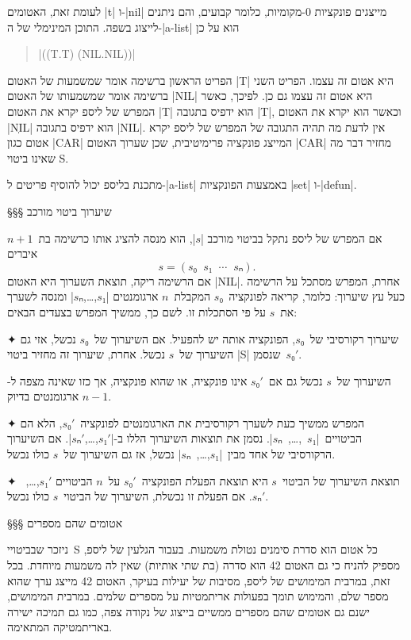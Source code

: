 לעומת זאת, האטומים \E|t| ו-\E|nil| מייצגים פונקציות 0-מקומיות, כלומר קבועים,
והם ניתנים לייצוג בשפה. התוכן המינימלי של ה-\E|a-list| הוא על כן
\begin{english}
  \begin{quote}
    \T|((T.T) (NIL.NIL))|
  \end{quote}
\end{english}
הפריט הראשון ברשימה אומר שמשמעות של האטום \T|T| היא אטום זה עצמו. הפריט השני
ברשימה אומר שמשמעותו של האטום \T|NIL| היא אטום זה עצמו גם כן.
לפיכך, כאשר המפרש של ליספ יקרא את האטום \T|T| הוא ידפיס בתגובה \T|T|, וכאשר הוא
יקרא את האטום \T|NִִִIL| הוא ידפיס בתגובה \T|NIL|.
אין לדעת מה תהיה התגובה של המפרש של ליספ יקרא אטום כגון
\T|CAR| המייצג פונקציה פרימיטיבית, שכן שערוך האטום
\T|CAR| מחזיר דבר מה שאינו ביטוי S.

מתכנת בליספ יכול להוסיף פריטים ל-\E|a-list| באמצעות הפונקציות \E|set|
ו-\E|defun|.

§§§ שיערוך ביטוי מורכב

אם המפרש של ליספ נתקל בביטוי מורכב \E|$s$|, הוא מנסה להציג אותו כרשימה בת~$n+1$
איברים \[
  s=(s₀\;\;s₁\;\;⋯\;\;sₙ).
\] אם הרשימה ריקה, תוצאת השערוך היא האטום \E|NIL|.
אחרת, המפרש מסתכל על הרשימה כעל עץ שיערוך: כלומר, קריאה לפונקציה~$s₀$
המקבלת~$n$ ארגומנטים \E|$s₁$,…,$sₙ$| ומנסה לשערך
את~$s$ על פי הסתכלות זו. לשם כך, ממשיך המפרש בצעדים הבאים:
\begin{enumerate}
  ✦ שיערוך רקורסיבי של~$s₀$, הפונקציה אותה יש להפעיל. אם השיערוך של~$s₀$ נכשל,
  אזי גם השיערוך של~$s$ נכשל. אחרת, שיערוך זה מחזיר ביטוי \E|S| שנסמן~$s₀'$.

  השיערוך של~$s$ נכשל גם אם~$s₀'$ אינו פונקציה, או שהוא פונקציה, אך כזו שאינה
  מצפה ל-$n-1$ ארגומנטים בדיוק.

  ✦ המפרש ממשיך כעת לשערך רקורסיבית את הארגומנטים לפונקציה~$s₀'$, הלא הם
  הביטויים~\E|$s₁$~,…,~$sₙ$|. נסמן את תוצאות השיערוך הללו ב-\E|$s₁'$,…,$sₙ'$|.
  אם השיערוך הרקורסיבי של אחד מבין~\E|$s₁$,…,~$sₙ$| נכשל, אז גם השיערוך של~$s$
  כולו נכשל.

  ✦ תוצאת השיערוך של הביטוי~$s$ היא תוצאת הפעלת הפונקציה~$s₀'$ על~$n$ הביטויים
  $s₁'$,…,~$sₙ'$. אם הפעלת זו נכשלת, השיערוך של הביטוי~$s$ כולו נכשל.
\end{enumerate}

§§§ אטומים שהם מספרים

ניזכר שבביטויי~S כל אטום הוא סדרת סימנים נטולת משמעות. בעבור הגלעין של ליספ,
מספיק להניח כי גם האטום 42 הוא סדרה (בת שתי אותיות) שאין לה משמעות מיוחדת. בכל
זאת, במרבית המימושים של ליספ, מסיבות של יעילות בעיקר, האטום 42 מייצג ערך שהוא
מספר שלם, והמימוש תומך בפעולות אריתמטיות על מספרים שלמים. במרבית המימושים, ישנם
גם אטומים שהם מספרים ממשיים בייצוג של נקודה צפה, כמו גם תמיכה ישירה באריתמטיקה
המתאימה.

